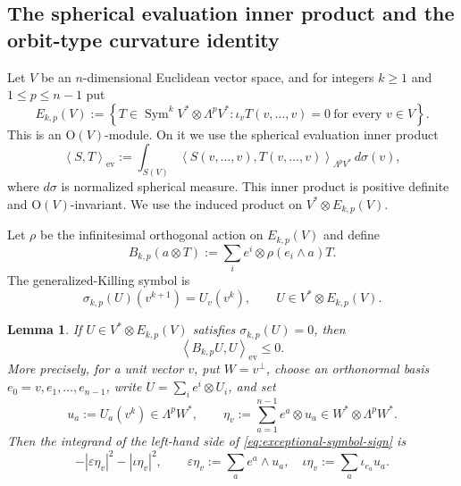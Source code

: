 \documentclass[reqno,11pt]{amsart}
\newtheorem{lemma}[theorem]{Lemma}
\theoremstyle{definition}
\newcommand{\Sym}{\operatorname{Sym}}
\newcommand{\inner}[2]{\left\langle #1,#2\right\rangle}
\begin{document}
\subsection{The spherical evaluation inner product and the orbit-type curvature identity}
\label{sec:orbit-type-framework}

Let $V$ be an $n$-dimensional Euclidean vector space, and for integers
$k\geq1$ and $1\leq p\leq n-1$ put
\begin{equation}\label{eq:normal-form-module}
 E_{k,p}(V):=
 \left\{
 T\in\Sym^kV^*\otimes\Lambda^pV^*:
 \iota_vT(v,\ldots,v)=0\ \text{for every }v\in V
 \right\}.
\end{equation}
This is an $\mathrm O(V)$-module.  On it we use the spherical evaluation inner
product
\begin{equation}\label{eq:evaluation-inner-product}
 \inner{S}{T}_{\mathrm{ev}}
 :=\int_{S(V)}
 \inner{S(v,\ldots,v)}{T(v,\ldots,v)}_{\Lambda^pV^*}
 \,d\sigma(v),
\end{equation}
where $d\sigma$ is normalized spherical measure.  This inner product is
positive definite and $\mathrm O(V)$-invariant.  We use the induced product
on $V^*\otimes E_{k,p}(V)$.

Let $\rho$ be the infinitesimal orthogonal action on $E_{k,p}(V)$ and define
\begin{equation}\label{eq:exceptional-B}
 B_{k,p}(a\otimes T)
 :=\sum_i e^i\otimes\rho(e_i\wedge a)T.
\end{equation}
The generalized-Killing symbol is
\begin{equation*}
 \sigma_{k,p}(U)(v^{k+1})=U_v(v^k),
 \qquad U\in V^*\otimes E_{k,p}(V).
\end{equation*}

\begin{lemma}
\label{lem:exceptional-symbol-sign}
If $U\in V^*\otimes E_{k,p}(V)$ satisfies $\sigma_{k,p}(U)=0$, then
\begin{equation}\label{eq:exceptional-symbol-sign}
 \inner{B_{k,p}U}{U}_{\mathrm{ev}}\leq0.
\end{equation}
More precisely, for a unit vector $v$, put $W=v^\perp$, choose an
orthonormal basis $e_0=v,e_1,\ldots,e_{n-1}$, write
$U=\sum_i e^i\otimes U_i$, and set
$$
 u_a:=U_a(v^k)\in\Lambda^pW^*,
 \qquad
 \eta_v:=\sum_{a=1}^{n-1}e^a\otimes u_a
 \in W^*\otimes\Lambda^pW^*.
$$
Then the integrand of the left-hand side of
\eqref{eq:exceptional-symbol-sign} is
\begin{equation*}
 -|\varepsilon\eta_v|^2-|\iota\eta_v|^2,
 \qquad
 \varepsilon\eta_v:=\sum_a e^a\wedge u_a,
 \quad
 \iota\eta_v:=\sum_a\iota_{e_a}u_a.
\end{equation*}
\end{lemma}
\end{document}
